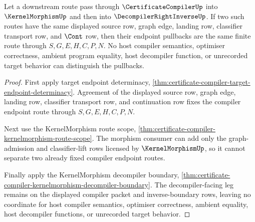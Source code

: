 \begin{theorem}
\label{thm:certificate-compiler-endpoint-route-pullback-determinacy}
Let a downstream route pass through $\CertificateCompilerUp$ into $\KernelMorphismUp$ and then into $\DecompilerRightInverseUp$. If two such routes have the same displayed source row, graph edge, landing row, classifier transport row, and $\Cont$ row, then their endpoint pullbacks are the same finite route through $S,G,E,H,C,P,N$. No host compiler semantics, optimiser correctness, ambient program equality, host decompiler function, or unrecorded target behavior can distinguish the pullbacks.
\end{theorem}
\begin{proof}
First apply target endpoint determinacy, \autoref{thm:certificate-compiler-target-endpoint-determinacy}. Agreement of the displayed source row, graph edge, landing row, classifier transport row, and continuation row fixes the compiler endpoint route through $S,G,E,H,C,P,N$.

Next use the KernelMorphism route scope, \autoref{thm:certificate-compiler-kernelmorphism-route-scope}. The morphism consumer can add only the graph-admission and classifier-lift rows licensed by $\KernelMorphismUp$, so it cannot separate two already fixed compiler endpoint routes.

Finally apply the KernelMorphism decompiler boundary, \autoref{thm:certificate-compiler-kernelmorphism-decompiler-boundary}. The decompiler-facing leg remains on the displayed compiler packet and inverse-boundary rows, leaving no coordinate for host compiler semantics, optimiser correctness, ambient equality, host decompiler functions, or unrecorded target behavior.
\end{proof}

